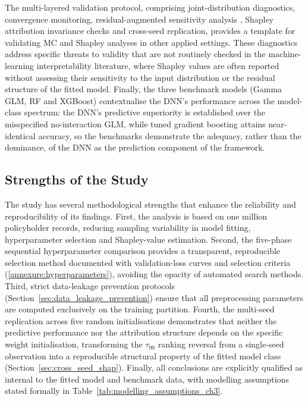 The multi-layered validation protocol, comprising joint-distribution
diagnostics, convergence monitoring, residual-augmented sensitivity
analysis \citep{saltelli2002making}, Shapley attribution invariance
checks and cross-seed replication, provides a template for validating
MC and Shapley analyses in other applied settings.
These diagnostics address specific threats to validity that are not
routinely checked in the machine-learning interpretability literature,
where Shapley values are often reported without assessing their
sensitivity to the input distribution or the residual structure of the
fitted model.  Finally, the three benchmark models (Gamma GLM, RF and
XGBoost) contextualise the DNN's performance across the model-class
spectrum: the DNN's predictive superiority is established over
the misspecified no-interaction GLM, while tuned gradient
boosting attains near-identical accuracy, so the benchmarks demonstrate
the adequacy, rather than the dominance, of the DNN as the
prediction component of the framework.


\subsection{Strengths of the Study}
\label{sec:strengths}

The study has several methodological strengths that enhance the
reliability and reproducibility of its findings.  First, the analysis
is based on one million policyholder records, reducing sampling
variability in model fitting, hyperparameter selection and Shapley-value
estimation.  Second, the five-phase sequential hyperparameter comparison
provides a transparent, reproducible selection method documented with
validation-loss curves and selection criteria
(\ref{annexure:hyperparameters}), avoiding the opacity of
automated search methods.  Third, strict data-leakage prevention
protocols (Section~\ref{sec:data_leakage_prevention}) ensure that all
preprocessing parameters are computed exclusively on the training
partition.  Fourth, the multi-seed replication across five random
initialisations demonstrates that neither the predictive performance nor
the attribution structure depends on the specific weight initialisation,
transforming the $\tau_{99}$ ranking reversal from a single-seed
observation into a reproducible structural property of the fitted model
class (Section~\ref{sec:cross_seed_shap}).  Finally, all conclusions
are explicitly qualified as internal to
the fitted model and benchmark data, with modelling assumptions stated
formally in Table~\ref{tab:modelling_assumptions_ch3}.

